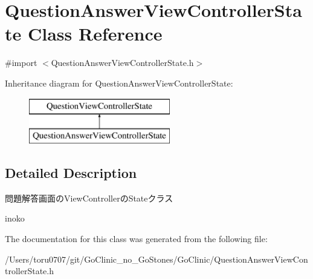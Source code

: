 \hypertarget{interface_question_answer_view_controller_state}{
\section{QuestionAnswerViewControllerState Class Reference}
\label{interface_question_answer_view_controller_state}
}


{\ttfamily \#import $<$QuestionAnswerViewControllerState.h$>$}

Inheritance diagram for QuestionAnswerViewControllerState:\begin{figure}[H]
\begin{center}
\leavevmode
\includegraphics[height=2.000000cm]{interface_question_answer_view_controller_state}
\end{center}
\end{figure}


\subsection{Detailed Description}
問題解答画面のViewControllerのStateクラス

inoko 

The documentation for this class was generated from the following file:\begin{DoxyCompactItemize}
\item 
/Users/toru0707/git/GoClinic\_\-no\_\-GoStones/GoClinic/QuestionAnswerViewControllerState.h\end{DoxyCompactItemize}
